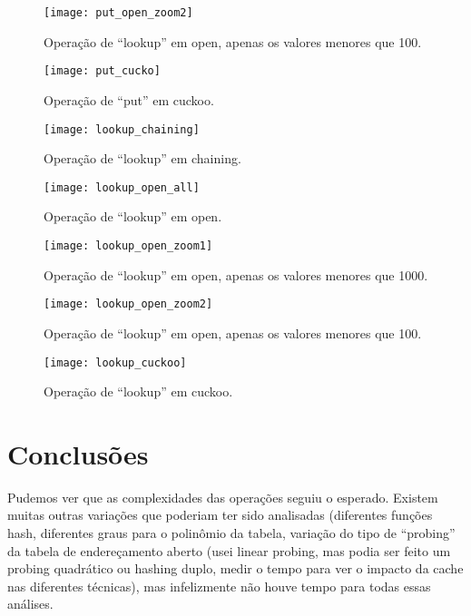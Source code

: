 \documentclass{article}
\begin{document}
\begin{figure}
  \centering
  \texttt{[image: put\_open\_zoom2]}
  \caption{Operação de ``lookup'' em open, apenas os valores menores que 100.}
  \label{fig:put_open_zoom2}
\end{figure}

\begin{figure}
  \centering
  \texttt{[image: put\_cucko]}
  \caption{Operação de ``put'' em cuckoo.}
  \label{fig:put_cuckoo}
\end{figure}

\begin{figure}
  \centering
  \texttt{[image: lookup\_chaining]}
  \caption{Operação de ``lookup'' em chaining.}
  \label{fig:lookup_chaining}
\end{figure}

\begin{figure}
  \centering
  \texttt{[image: lookup\_open\_all]}
  \caption{Operação de ``lookup'' em open.}
  \label{fig:lookup_open}
\end{figure}

\begin{figure}
  \centering
  \texttt{[image: lookup\_open\_zoom1]}
  \caption{Operação de ``lookup'' em open, apenas os valores menores que 1000.}
  \label{fig:lookup_open_zoom1}
\end{figure}

\begin{figure}
  \centering
  \texttt{[image: lookup\_open\_zoom2]}
  \caption{Operação de ``lookup'' em open, apenas os valores menores que 100.}
  \label{fig:lookup_open_zoom2}
\end{figure}

\begin{figure}
  \centering
  \texttt{[image: lookup\_cuckoo]}
  \caption{Operação de ``lookup'' em cuckoo.}
  \label{fig:lookup_cuckoo}
\end{figure}

\section{Conclusões}

Pudemos ver que as complexidades das operações seguiu o esperado. Existem muitas outras variações
que poderiam ter sido analisadas (diferentes funções hash, diferentes graus para o polinômio da
tabela, variação do tipo de ``probing'' da tabela de endereçamento aberto (usei linear probing, mas
podia ser feito um probing quadrático ou hashing duplo, medir o tempo para ver o impacto da cache
nas diferentes técnicas), mas infelizmente não houve tempo para todas essas análises.
\end{document}
